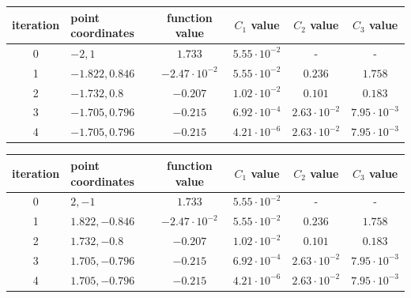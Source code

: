 \documentclass[12pt]{article}
\begin{document}
	\begin{table}[H]
		\begin{tabularx}{\textwidth}{c|X|c|c|c|c|}
			iteration & point coordinates & function value & $C_1$ value & $C_2$ value & $C_3$ value\\
			\hline
			0 & $-2, 1$ & $1.733$ & $5.55\cdot10^{-2}$ & - & - \\
			\hline
			1 & $-1.822, 0.846$ & $-2.47\cdot10^{-2}$ & $5.55\cdot10^{-2}$ & $0.236$ & $1.758$ \\
			\hline
			2 & $-1.732, 0.8$ & $-0.207$ & $1.02\cdot10^{-2}$ & $0.101$ & $0.183$ \\ 
			\hline
			3 & $-1.705, 0.796$ & $-0.215$ & $6.92\cdot10^{-4}$ & $2.63\cdot10^{-2}$ & $7.95\cdot10^{-3}$ \\
			\hline
			4 & $-1.705, 0.796$ & $-0.215$ & $4.21\cdot10^{-6}$ & $2.63\cdot10^{-2}$ & $7.95\cdot10^{-3}$ \\
			\hline
		\end{tabularx}	
	\end{table}	

	\begin{table}[H]
		\begin{tabularx}{\textwidth}{c|X|c|c|c|c|}
			iteration & point coordinates & function value & $C_1$ value & $C_2$ value & $C_3$ value\\
			\hline
			0 & $2, -1$ & $1.733$ & $5.55\cdot10^{-2}$ & - & - \\
			\hline
			1 & $1.822, -0.846$ & $-2.47\cdot10^{-2}$ & $5.55\cdot10^{-2}$ & $0.236$ & $1.758$ \\
			\hline
			2 & $1.732, -0.8$ & $-0.207$ & $1.02\cdot10^{-2}$ & $0.101$ & $0.183$ \\ 
			\hline
			3 & $1.705, -0.796$ & $-0.215$ & $6.92\cdot10^{-4}$ & $2.63\cdot10^{-2}$ & $7.95\cdot10^{-3}$ \\
			\hline
			4 & $1.705, -0.796$ & $-0.215$ & $4.21\cdot10^{-6}$ & $2.63\cdot10^{-2}$ & $7.95\cdot10^{-3}$ \\
			\hline
		\end{tabularx}	
	\end{table}	
\end{document}
